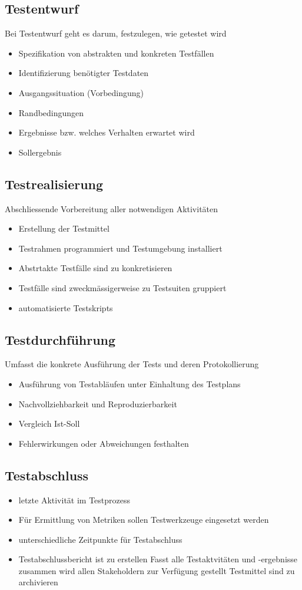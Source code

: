 \documentclass{report}
\theoremstyle{definition}
\theoremstyle{example}
\begin{document}
\subsection{Testentwurf}
Bei Testentwurf geht es darum, festzulegen, wie getestet wird
\begin{itemize}
   \item Spezifikation von abstrakten und konkreten Testfällen
   \item Identifizierung benötigter Testdaten
   \item Ausgangssituation (Vorbedingung)
   \item Randbedingungen
   \item Ergebnisse bzw. welches Verhalten erwartet wird
   \item Sollergebnis
\end{itemize}

\subsection{Testrealisierung}
Abschliessende Vorbereitung aller notwendigen Aktivitäten
\begin{itemize}
   \item Erstellung der Testmittel
   \item Testrahmen programmiert und Testumgebung installiert
   \item Abstrtakte Testfälle sind zu konkretisieren
   \item Testfälle sind zweckmässigerweise zu Testsuiten gruppiert
   \item automatisierte Testskripts
\end{itemize}

\subsection{Testdurchführung}
Umfasst die konkrete Ausführung der Tests und deren Protokollierung
\begin{itemize}
   \item Ausführung von Testabläufen unter Einhaltung des Testplans
   \item Nachvollziehbarkeit und Reproduzierbarkeit
   \item Vergleich Ist-Soll
   \item Fehlerwirkungen oder Abweichungen festhalten
\end{itemize}

\subsection{Testabschluss}
\begin{itemize}
   \item letzte Aktivität im Testprozess
   \item Für Ermittlung von Metriken sollen Testwerkzeuge eingesetzt werden
   \item unterschiedliche Zeitpunkte für Testabschluss
   \item Testabschlussbericht ist zu erstellen
   \subitem Fasst alle Testaktvitäten und -ergebnisse zusammen
   \subitem wird allen Stakeholdern zur Verfügung gestellt
   \subitem Testmittel sind zu archivieren
\end{itemize}
\end{document}
